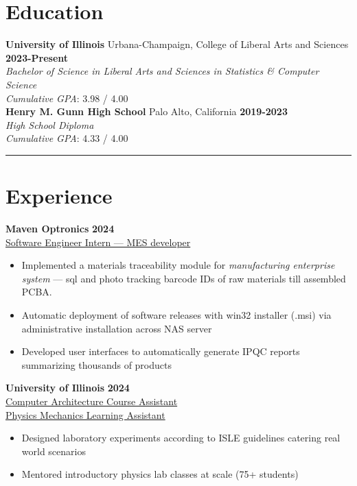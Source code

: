 \documentclass[11pt]{article}
\begin{document}

\section*{Education}
\vspace*{-1mm}

\textbf{University of Illinois} Urbana-Champaign, College of Liberal Arts and Sciences \hfill \textbf{2023-Present} \\
\emph{Bachelor of Science in Liberal Arts and Sciences in Statistics \& Computer Science} \\
\emph{Cumulative GPA}: 3.98 / 4.00 \\

\textbf{Henry M. Gunn High School} Palo Alto, California \hfill \textbf{2019-2023} \\
\emph{High School Diploma} \\
\emph{Cumulative GPA}: 4.33 / 4.00 \\

\vspace*{-5mm}
\rule{\textwidth}{0.1pt}
\vspace*{-10mm}

\section*{Experience}
\vspace*{-1mm}

\textbf{Maven Optronics} \hfill \textbf{2024} \\
\underline{Software Engineer Intern --- MES developer}
\begin{itemize}
	\cramped
    \item Implemented a materials traceability module for \emph{manufacturing enterprise system} --- sql and photo tracking barcode IDs of raw materials till assembled PCBA.
    \item Automatic deployment of software releases with win32 installer (.msi) via administrative installation across NAS server
    \item Developed user interfaces to automatically generate IPQC reports summarizing thousands of products
\end{itemize}

\textbf{University of Illinois} \hfill \textbf{2024} \\
\underline{Computer Architecture Course Assistant} \\
\underline{Physics Mechanics Learning Assistant}
\begin{itemize}
	\cramped
	\item Designed laboratory experiments according to ISLE guidelines catering real world scenarios
    \item Mentored introductory physics lab classes at scale (75+ students)
\end{itemize}
\end{document}
